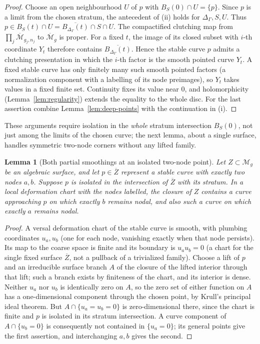 \documentclass[11pt]{article}
\newcommand{\M}{\mathcal M}
\newcommand{\cl}[1]{\overline{#1}}
\newtheorem{lemma}[theorem]{Lemma}
\theoremstyle{remark}
\begin{document}
\begin{proof}
Choose an open neighbourhood \(U\) of \(p\) with
\(B_S(0)\cap U=\{p\}\). Since \(p\) is a limit from the chosen
stratum, the antecedent of (ii) holds for
\(\Delta_\Gamma,S,U\). Thus
\(p\in B_S(t)\cap U=\cl{B_{\Delta_\Gamma}(t)}\cap S\cap U\).
The compactified clutching map from
\(\prod_j\cl{\M}_{g_j,n_j}\) to \(\cl{\M}_g\) is proper. For a fixed \(t\),
the image of its closed subset with \(i\)-th coordinate \(Y_t\)
therefore contains \(\cl{B_{\Delta_\Gamma}(t)}\).
Hence the stable curve \(p\) admits a clutching presentation in
which the \(i\)-th factor is the smooth pointed curve \(Y_t\).
A fixed stable curve has only finitely many such smooth pointed
factors (a normalization component with a labelling of its node
preimages), so \(Y_t\) takes values in a fixed finite set.
Continuity fixes its value near \(0\), and holomorphicity
(Lemma~\ref{lem:regularity}) extends the equality to the whole disc.
For the last assertion combine Lemma~\ref{lem:deep-points} with the
continuation in (i).
\end{proof}

These arguments require isolation in the \emph{whole} stratum
intersection \(B_S(0)\), not just among the limits of the chosen
curve; the next lemma, about a single surface, handles symmetric
two-node corners without any lifted family.

\begin{lemma}[Both partial smoothings at an isolated two-node point]
\label{lem:plumbing}
Let \(Z\subset\M_g\) be an algebraic surface, and let
\(p\in\cl Z\) represent a stable curve with exactly two nodes \(a,b\).
Suppose \(p\) is isolated in the intersection of \(\cl Z\) with its
stratum. In a local deformation chart with the nodes labelled, the
closure of \(Z\) contains a curve approaching \(p\) on which exactly
\(b\) remains nodal, and also such a curve on which exactly
\(a\) remains nodal.
\end{lemma}

\begin{proof}
A versal deformation chart of the stable curve is smooth,
with plumbing coordinates \(u_a,u_b\) (one for each node, vanishing
exactly when that node persists). Its map to the coarse space
is finite and its boundary is \(u_a u_b=0\)
\cite[Sections 8--10, Proposition 12.2 and Corollary 12.3]{HubbardKoch}
(a chart for the single fixed surface \(\cl Z\), not a pullback of a
trivialized family). Choose a lift of \(p\) and an irreducible surface branch \(A\)
of the closure of the lifted interior through that lift; such a
branch exists by finiteness of the chart, and its interior is dense.
Neither \(u_a\) nor \(u_b\) is identically zero on \(A\), so
the zero set of either function on \(A\) has a one-dimensional
component through the chosen point, by Krull's principal ideal
theorem. But \(A\cap\{u_a=u_b=0\}\)
is zero-dimensional there, since the chart is finite and \(p\) is
isolated in its stratum intersection. A curve component of
\(A\cap\{u_b=0\}\) is consequently not contained in \(\{u_a=0\}\);
its general points give the first assertion, and interchanging
\(a,b\) gives the second.
\end{proof}
\end{document}
